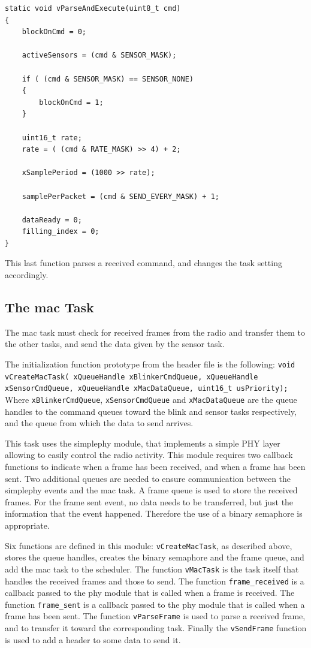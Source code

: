 \documentclass[11pt]{report}
\begin{document}
\begin{verbatim}
static void vParseAndExecute(uint8_t cmd)
{
    blockOnCmd = 0;
    
    activeSensors = (cmd & SENSOR_MASK);
    
    if ( (cmd & SENSOR_MASK) == SENSOR_NONE)
    {
        blockOnCmd = 1;
    }
    
    uint16_t rate;
    rate = ( (cmd & RATE_MASK) >> 4) + 2;
    
    xSamplePeriod = (1000 >> rate);
    
    samplePerPacket = (cmd & SEND_EVERY_MASK) + 1;
    
    dataReady = 0;
    filling_index = 0;
}
\end{verbatim}
This last function parses a received command, and changes the task setting accordingly.

\subsection{The mac Task}

The mac task must check for received frames from the radio and transfer them to the other tasks, and send the data given by the sensor task.

The initialization function prototype from the header file is the following:
\verb$void vCreateMacTask( xQueueHandle xBlinkerCmdQueue, xQueueHandle xSensorCmdQueue, xQueueHandle xMacDataQueue, uint16_t usPriority);$
Where \verb$xBlinkerCmdQueue$, \verb$xSensorCmdQueue$ and \verb$xMacDataQueue$ are the queue handles to the command queues toward the blink and sensor tasks respectively, and the queue from which the data to send arrives.

This task uses the simplephy module, that implements a simple PHY layer allowing to easily control the radio activity. This module requires two callback functions to indicate when a frame has been received, and when a frame has been sent. Two additional queues are needed to ensure communication between the simplephy events and the mac task. A frame queue is used to store the received frames. For the frame sent event, no data needs to be transferred, but just the information that the event happened. Therefore the use of a binary semaphore is appropriate.

Six functions are defined in this module: \verb$vCreateMacTask$, as described above, stores the queue handles, creates the binary semaphore and the frame queue, and add the mac task to the scheduler. The function \verb$vMacTask$ is the task itself that handles the received frames and those to send. The function \verb$frame_received$ is a callback passed to the phy module that is called when a frame is received. The function \verb$frame_sent$ is a callback passed to the phy module that is called when a frame has been sent. The function \verb$vParseFrame$ is used to parse a received frame, and to transfer it toward the corresponding task. Finally the  \verb$vSendFrame$ function is used to add a header to some data to send it.
\end{document}

